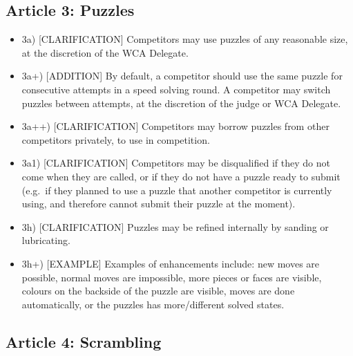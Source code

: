 \subsection{ Article 3: Puzzles}

\begin{itemize}
\item
  3a) {[}CLARIFICATION{]} Competitors may use puzzles of any reasonable
  size, at the discretion of the WCA Delegate.
\item
  3a+) {[}ADDITION{]} By default, a competitor should use the same
  puzzle for consecutive attempts in a speed solving round. A competitor
  may switch puzzles between attempts, at the discretion of the judge or
  WCA Delegate.
\item
  3a++) {[}CLARIFICATION{]} Competitors may borrow puzzles from other
  competitors privately, to use in competition.
\item
  3a1) {[}CLARIFICATION{]} Competitors may be disqualified if they do
  not come when they are called, or if they do not have a puzzle ready
  to submit (e.g.~if they planned to use a puzzle that another
  competitor is currently using, and therefore cannot submit their
  puzzle at the moment).
\item
  3h) {[}CLARIFICATION{]} Puzzles may be refined internally by sanding
  or lubricating.
\item
  3h+) {[}EXAMPLE{]} Examples of enhancements include: new moves are
  possible, normal moves are impossible, more pieces or faces are
  visible, colours on the backside of the puzzle are visible, moves are
  done automatically, or the puzzles has more/different solved states.
\end{itemize}

\subsection{ Article 4: Scrambling}

